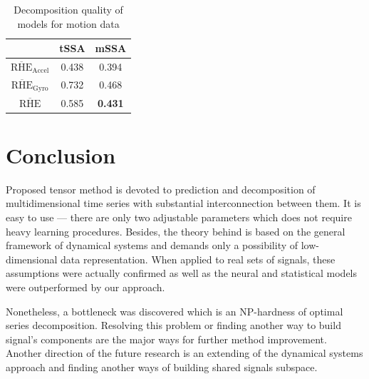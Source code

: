 \documentclass[referee, pdflatex, sn-mathphys-num]{sn-jnl}
\theoremstyle{definition}
\theoremstyle{plain}
\begin{document}
	\def\arraystretch{1.2}
	\begin{table}[h!]
		\centering
		\caption{Decomposition quality of models for motion data}\label{tab:decomp_motion_results}
		\begin{tabular}{|c|c|c|}
			\hline
			& tSSA  & mSSA           \\ \hline
			$ \overline{\text{RHE}}_{\text{Accel}} $   & 0.438 & 0.394          \\ \hline
			$ \overline{\text{RHE}}_{\text{Gyro}} $ & 0.732 & 0.468          \\ \hline
			$ \overline{\text{RHE}} $         & 0.585 & \textbf{0.431} \\ \hline
		\end{tabular}
	\end{table}	
	
	\section{Conclusion}
	
		Proposed tensor method is devoted to prediction and decomposition of multidimensional time series with substantial interconnection between them. It is easy to use --- there are only two adjustable parameters which does not require heavy learning procedures. Besides, the theory behind is based on the general framework of dynamical systems and demands only a possibility of low-dimensional data representation. When applied to real sets of signals, these assumptions were actually confirmed as well as the neural and statistical models were outperformed by our approach. 
		
		Nonetheless, a bottleneck was discovered which is an NP-hardness of optimal series decomposition. Resolving this problem or finding another way to build signal's components are the major ways for further method improvement. Another direction of the future research is an extending of the dynamical systems approach and finding another ways of building shared signals subspace. 
		
		
	
 
\end{document}
